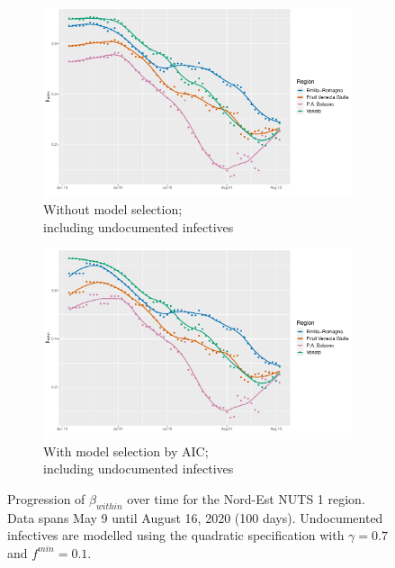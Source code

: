 \documentclass[12pt]{article}
\begin{document}
    \begin{figure}[H]\ContinuedFloat
	    \begin{subfigure}{\textwidth}
	      \centering
	      \includegraphics[width=0.92\linewidth]{output/model_within_lag14_betawithin_Nord-Est_UndocQuadratic_rolling.pdf}
	      \caption{Without model selection; \\ including undocumented infectives}
	      \label{fig:beta_within_over_time_nordest_regular_undoc}
	    \end{subfigure}\newline
	    \begin{subfigure}{\textwidth}
	      \centering
	      \includegraphics[width=0.92\linewidth]{output/model_within_lag14_betawithin_Nord-Est_aic_UndocQuadratic_rolling.pdf}
	      \caption{With model selection by AIC; \\ including undocumented infectives}
	      \label{fig:beta_within_over_time_nordest_aic_undoc}
	    \end{subfigure}
	    \caption{Progression of $\beta_{within}$ over time for the Nord-Est NUTS 1 region. Data spans May 9 until August 16, 2020 (100 days). Undocumented infectives are modelled using the quadratic specification with $\gamma = 0.7$ and $f^{min}=0.1$.}
	    \label{fig:beta_within_over_time_nordest}
    \end{figure}
	
\end{document}
